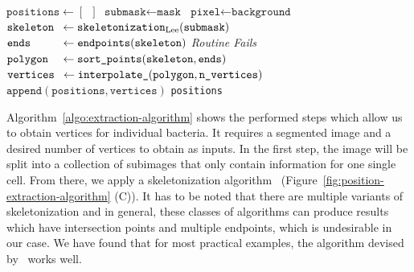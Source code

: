 
\begin{algorithm}
    \caption{Position Extraction Algorithm}
    \label{algo:extraction-algorithm}
    \begin{algorithmic}[1]
        \State $\texttt{positions} \gets [\hspace{6pt}]$
        \State $\texttt{submask} \gets \texttt{mask}$%
        \State $\texttt{pixel}\gets\texttt{background}$
        \EndIf
        \EndFor
        \State $\mathrlap{\texttt{skeleton}}\hphantom{\texttt{verticess}} \gets
        \texttt{skeletonization}_\text{Lee}(\texttt{submask})$
        \State $\mathrlap{\texttt{ends}}\hphantom{\texttt{verticess}} \gets
        \texttt{endpoints}(\texttt{skeleton})$
        \State \textit{Routine Fails}
        \EndIf
        \State $\mathrlap{\texttt{polygon}}\hphantom{\texttt{verticess}} \gets
        \texttt{sort\_points}(\texttt{skeleton},\texttt{ends})$
        \State $\mathrlap{\texttt{vertices}}\hphantom{\texttt{verticess}} \gets
        \texttt{interpolate\_}(\texttt{polygon}, \texttt{n\_vertices})$
        \State $\texttt{append}(\texttt{positions}, \texttt{vertices})$
        \EndFor
        \State \Return \texttt{positions}
        \EndFunction
    \end{algorithmic}
\end{algorithm}

Algorithm~\ref{algo:extraction-algorithm} shows the performed steps which allow us to obtain
vertices for individual bacteria.
It requires a segmented image and a desired number of vertices to obtain as inputs.
In the first step, the image will be split into a collection of subimages that only contain
information for one single cell.
From there, we apply a skeletonization algorithm~\cite{Lee1994}
(Figure~\ref{fig:position-extraction-algorithm} (C)).
It has to be noted that there are multiple variants of skeletonization and in
general, these classes
of algorithms can produce results which have intersection points and multiple
endpoints, which is
undesirable in our case.
We have found that for most practical examples, the algorithm devised
by~\cite{Lee1994} works well.\\

